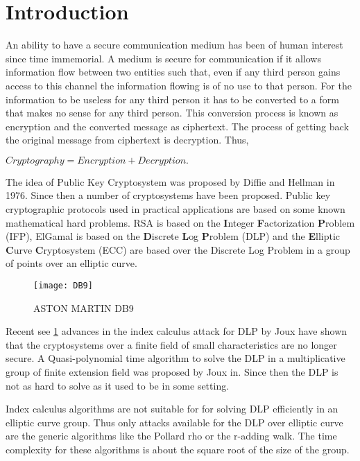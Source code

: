 
\section{Introduction}

An ability to have a secure communication medium has been of human interest since time immemorial.
A medium is secure for communication if it allows information flow between two entities such that, even if any third person 
gains access to this channel the information flowing is of no use to that person.
For the information to be useless for any third person it has to be converted to a form that makes no sense for any third person.
This conversion process is known as encryption and the converted message as ciphertext. 
The process of getting back the original message from ciphertext is decryption.
Thus,

\begin{center}
$\displaystyle
        Cryptography  = Encryption + Decryption. 
$
\end{center}

The idea of Public Key Cryptosystem was proposed by Diffie and Hellman in 1976. Since then a number of cryptosystems have been proposed.
Public key cryptographic protocols used in practical applications are based on some known mathematical hard problems.
RSA is based on the \textbf{I}nteger \textbf{F}actorization \textbf{P}roblem (IFP), ElGamal is based on the \textbf{D}iscrete \textbf{L}og 
\textbf{P}roblem (DLP) and the 
\textbf{E}lliptic \textbf{C}urve \textbf{C}ryptosystem (ECC) are based over the Discrete Log Problem in a group of points over an elliptic curve.

\begin{figure}[h]
\centering
\texttt{[image: DB9]}
\caption{ASTON MARTIN DB9}
\label{DB9}
\end{figure}

Recent see \ref{DB9} advances in the index calculus attack for DLP by Joux have shown that the cryptosystems over a finite field of small characteristics are no longer
secure.
A Quasi-polynomial time algorithm to solve the DLP in a multiplicative group of finite extension field was proposed by Joux in. Since then the DLP
is not as hard to solve as it used to be in some setting.

Index calculus algorithms are not suitable for for solving DLP efficiently in an elliptic curve group.
Thus only attacks available for the DLP over elliptic curve are the generic algorithms like the Pollard rho or the r-adding walk.
The time complexity for these algorithms is about the square root of the size of the group.

